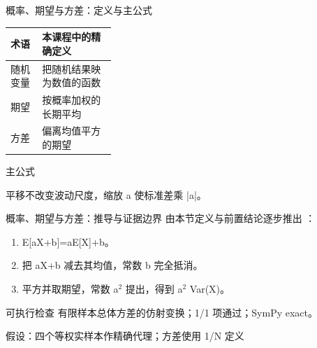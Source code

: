 \begin{frame}[t]{概率、期望与方差：定义与主公式}
\footnotesize\begin{tabularx}{\linewidth}{p{0.30\linewidth}Y}
\toprule 术语 & 本课程中的精确定义\\\midrule
{} 随机变量 & 把随机结果映为数值的函数\\
 期望 & 按概率加权的长期平均\\
 方差 & 偏离均值平方的期望\\
\bottomrule\end{tabularx}\vspace{0.15cm}
\begin{block}{ 主公式}\centering{}\end{block}
平移不改变波动尺度，缩放 a 使标准差乘 |a|。
\end{frame}

\begin{frame}[t]{概率、期望与方差：推导与证据边界}
\footnotesize
{}\quad 由本节定义与前置结论逐步推出 ：
\begin{enumerate}
\item E[aX+b]=aE[X]+b。
\item 把 aX+b 减去其均值，常数 b 完全抵消。
\item 平方并取期望，常数 a\ensuremath{^{2}} 提出，得到 a\ensuremath{^{2}} Var(X)。
\end{enumerate}\begin{block}{可执行检查}
\quad 有限样本总体方差的仿射变换；1/1 项通过；SymPy exact。
\par\scriptsize 假设：四个等权实样本作精确代理；方差使用 1/\allowbreak{}N 定义
\end{block}
\end{frame}

